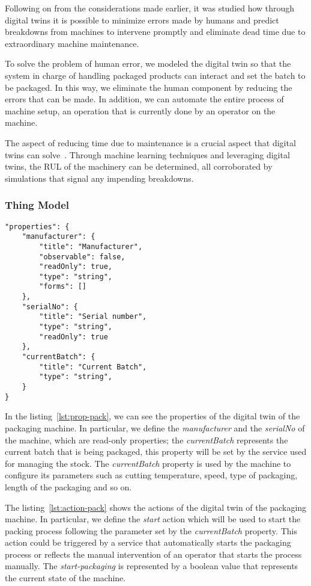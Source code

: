 Following on from the considerations made earlier, it was studied how through digital twins it is possible to minimize errors made by humans and
predict breakdowns from machines to intervene promptly and eliminate dead time due to extraordinary machine maintenance.

To solve the problem of human error, we modeled the digital twin so that the system in charge of handling packaged products can interact and set the
batch to be packaged.
In this way, we eliminate the human component by reducing the errors that can be made.
In addition, we can automate the entire process of machine setup, an operation that is currently done by an operator on the machine.

The aspect of reducing time due to maintenance is a crucial aspect that digital twins can solve~\cite{doi:10.1080/0951192X.2019.1686173}.
Through machine learning techniques and leveraging digital twins, the RUL of the machinery can be determined, all corroborated by simulations that
signal any impending breakdowns.

\subsubsection{Thing Model}

\begin{lstlisting}[caption={Properties of the packaging machine Thing Model.},label={lst:prop-pack}]
"properties": {
	"manufacturer": {
		"title": "Manufacturer",
		"observable": false,
		"readOnly": true,
		"type": "string",
		"forms": []
	},
	"serialNo": {
		"title": "Serial number",
		"type": "string",
		"readOnly": true
	},
	"currentBatch": {
		"title": "Current Batch",
		"type": "string",
	}
}
\end{lstlisting}

In the listing~\ref{lst:prop-pack}, we can see the properties of the digital twin of the packaging machine. In particular, we define the
\textit{manufacturer} and the \textit{serialNo} of the machine, which are read-only properties;
the \textit{currentBatch} represents the current batch that is being packaged, this property will be set by the service used for managing the stock.
The \textit{currentBatch} property is used by the machine to configure its parameters such as cutting temperature, speed, type of packaging, length
of the packaging and so on.

The listing~\ref{lst:action-pack} shows the actions of the digital twin of the packaging machine. In particular, we define the \textit{start} action
which will be used to start the packing process following the parameter set by the \textit{currentBatch} property.
This action could be triggered by a service that automatically starts the packaging process or reflects the manual intervention of an operator that starts the process manually.
The \textit{start-packaging} is represented by a boolean value that represents the current state of the machine.


